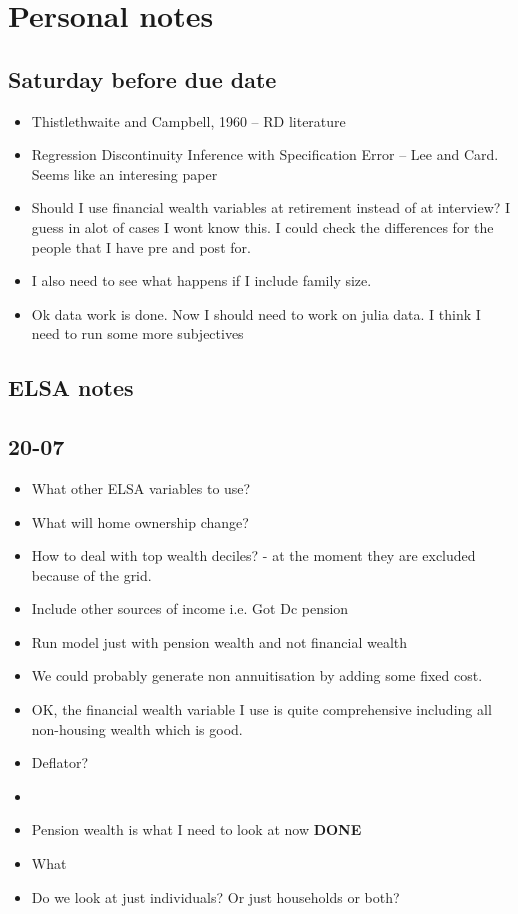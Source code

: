 \documentclass[12pt]{article}
\begin{document}
\section{Personal notes}

\subsection{Saturday before due date}
\begin{itemize}
    \item Thistlethwaite and Campbell, 1960 -- RD literature
    \item Regression Discontinuity Inference with Specification Error -- Lee and Card. Seems like an interesing paper
    \item Should I use financial wealth variables at retirement instead of at interview? I guess in alot of cases I wont
          know this. I could check the differences for the people that I have pre and post for.
    \item I also need to see what happens if I include family size.
    \item Ok data work is done. Now I should need to work on julia data. I think I need to run some more subjectives
\end{itemize}

\subsection{ELSA notes}
\subsection{\textbf{20-07}}
\begin{itemize}
    \item What other ELSA variables to use?
    \item What will home ownership change?
    \item How to deal with top wealth deciles? - at the moment they are excluded because of the grid.
    \item Include other sources of income i.e. Got Dc pension
    \item Run model just with pension wealth and not financial wealth
    \item We could probably generate non annuitisation by adding some fixed cost.
    \item OK, the financial wealth variable I use is quite comprehensive including all non-housing
          wealth which is good.
    \item Deflator?
    \item

    \item Pension wealth is what I need to look at now \textbf{DONE}
    \item What
    \item Do we look at just individuals? Or just households or both?
\end{itemize}
\end{document}
